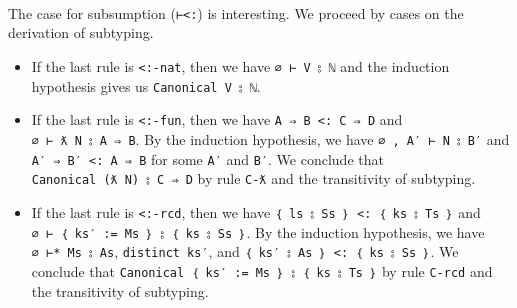 \begin{fence}
\begin{code}
\AgdaSymbol{(}\AgdaSpace{}%
\AgdaSpace{}%
\AgdaSymbol{(}\AgdaSpace{}%
\AgdaSymbol{\{}\AgdaSpace{}%
\AgdaSymbol{=}\AgdaSpace{}%
\AgdaSymbol{\}\{}\AgdaSpace{}%
\AgdaSymbol{=}\AgdaSpace{}%
\AgdaSymbol{\}\{}\AgdaSpace{}%
\AgdaSymbol{=}\AgdaSpace{}%
\AgdaSymbol{\}}\AgdaSpace{}%
\AgdaSpace{}%
\AgdaSymbol{))}\AgdaSpace{}%
\<%
\\
\>[0][@{}l@{\AgdaIndent{0}}]%
\>[4]\AgdaSpace{}%
\AgdaSpace{}%
\AgdaSpace{}%
\<%
\\
\>[0]\AgdaSpace{}%
\AgdaSymbol{|}%
\>[2202I]\AgdaSpace{}%
\AgdaSymbol{\{}\AgdaSpace{}%
\AgdaSymbol{=}\AgdaSpace{}%
\AgdaSymbol{\}}\AgdaSpace{}%
\AgdaSpace{}%
\AgdaSpace{}%
\AgdaSpace{}%
\AgdaSymbol{=}\<%
\\
\>[.][@{}l@{}]\<[2202I]%
\>[6]\AgdaSpace{}%
\AgdaSymbol{\{}\AgdaSpace{}%
\AgdaSymbol{=}\AgdaSpace{}%
\AgdaSpace{}%
\AgdaSymbol{\}}\AgdaSpace{}%
\AgdaSpace{}%
\AgdaSpace{}%
\AgdaSymbol{(}\AgdaSpace{}%
\AgdaSpace{}%
\AgdaSymbol{(}\AgdaSpace{}%
\AgdaSpace{}%
\AgdaSymbol{))}\<%
\end{code}
\end{fence}

The case for subsumption (\texttt{⊢\textless{}:}) is interesting. We
proceed by cases on the derivation of subtyping.

\begin{itemize}
\item
  If the last rule is \texttt{\textless{}:-nat}, then we have
  \texttt{∅\ ⊢\ V\ ⦂\ ℕ} and the induction hypothesis gives us
  \texttt{Canonical\ V\ ⦂\ ℕ}.
\item
  If the last rule is \texttt{\textless{}:-fun}, then we have
  \texttt{A\ ⇒\ B\ \textless{}:\ C\ ⇒\ D} and
  \texttt{∅\ ⊢\ ƛ\ N\ ⦂\ A\ ⇒\ B}. By the induction hypothesis, we have
  \texttt{∅\ ,\ A′\ ⊢\ N\ ⦂\ B′} and
  \texttt{A′\ ⇒\ B′\ \textless{}:\ A\ ⇒\ B} for some \texttt{A′} and
  \texttt{B′}. We conclude that \texttt{Canonical\ (ƛ\ N)\ ⦂\ C\ ⇒\ D}
  by rule \texttt{C-ƛ} and the transitivity of subtyping.
\item
  If the last rule is \texttt{\textless{}:-rcd}, then we have
  \texttt{｛\ ls\ ⦂\ Ss\ ｝\ \textless{}:\ ｛\ ks\ ⦂\ Ts\ ｝} and
  \texttt{∅\ ⊢\ ｛\ ks′\ :=\ Ms\ ｝\ ⦂\ ｛\ ks\ ⦂\ Ss\ ｝}. By the
  induction hypothesis, we have \texttt{∅\ ⊢*\ Ms\ ⦂\ As},
  \texttt{distinct\ ks′}, and
  \texttt{｛\ ks′\ ⦂\ As\ ｝\ \textless{}:\ ｛\ ks\ ⦂\ Ss\ ｝}. We
  conclude that
  \texttt{Canonical\ ｛\ ks′\ :=\ Ms\ ｝\ ⦂\ ｛\ ks\ ⦂\ Ts\ ｝} by rule
  \texttt{C-rcd} and the transitivity of subtyping.
\end{itemize}

